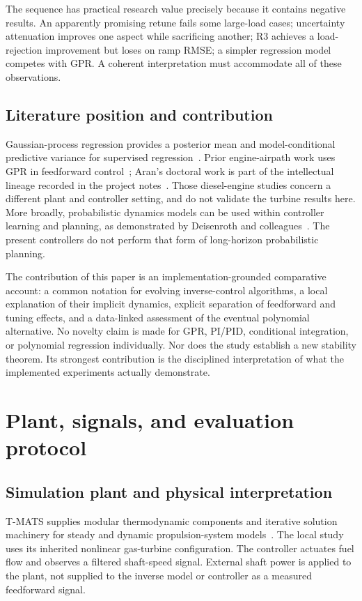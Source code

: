 \documentclass[11pt,a4paper,oneside]{report}
\begin{document}
The sequence has practical research value precisely because it contains negative results. An apparently promising retune fails some large-load cases; uncertainty attenuation improves one aspect while sacrificing another; R3 achieves a load-rejection improvement but loses on ramp RMSE; a simpler regression model competes with GPR. A coherent interpretation must accommodate all of these observations.

\section{Literature position and contribution}
Gaussian-process regression provides a posterior mean and model-conditional predictive variance for supervised regression~\cite{gpml}. Prior engine-airpath work uses GPR in feedforward control~\cite{aran}; Aran's doctoral work is part of the intellectual lineage recorded in the project notes~\cite{aranthesis}. Those diesel-engine studies concern a different plant and controller setting, and do not validate the turbine results here. More broadly, probabilistic dynamics models can be used within controller learning and planning, as demonstrated by Deisenroth and colleagues~\cite{deisenroth}. The present controllers do not perform that form of long-horizon probabilistic planning.

The contribution of this paper is an implementation-grounded comparative account: a common notation for evolving inverse-control algorithms, a local explanation of their implicit dynamics, explicit separation of feedforward and tuning effects, and a data-linked assessment of the eventual polynomial alternative. No novelty claim is made for GPR, PI/PID, conditional integration, or polynomial regression individually. Nor does the study establish a new stability theorem. Its strongest contribution is the disciplined interpretation of what the implemented experiments actually demonstrate.

\chapter{Plant, signals, and evaluation protocol}
\section{Simulation plant and physical interpretation}
T-MATS supplies modular thermodynamic components and iterative solution machinery for steady and dynamic propulsion-system models~\cite{tmats,tmatscode}. The local study uses its inherited nonlinear gas-turbine configuration. The controller actuates fuel flow and observes a filtered shaft-speed signal. External shaft power is applied to the plant, not supplied to the inverse model or controller as a measured feedforward signal.
\end{document}
